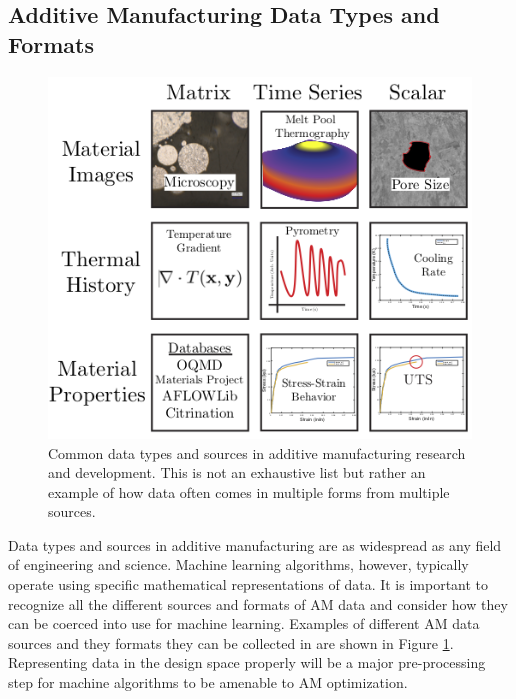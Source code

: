 \subsection{Additive Manufacturing Data Types and Formats}

\begin{figure}
	\includegraphics[width=1\linewidth]{Images/data_types.png}
	\caption{Common data types and sources in additive manufacturing research and development. This is not an exhaustive list but rather an example of how data often comes in multiple forms from multiple sources.}
	\label{datatypes}
\end{figure}

Data types and sources in additive manufacturing are as widespread as any field of engineering and science. Machine learning algorithms, however, typically operate using specific mathematical representations of data. It is important to recognize all the different sources and formats of AM data and consider how they can be coerced into use for machine learning. Examples of different AM data sources and they formats they can be collected in are shown in Figure \ref{datatypes}. Representing data in the design space properly will be a major pre-processing step for machine algorithms to be amenable to AM optimization.

